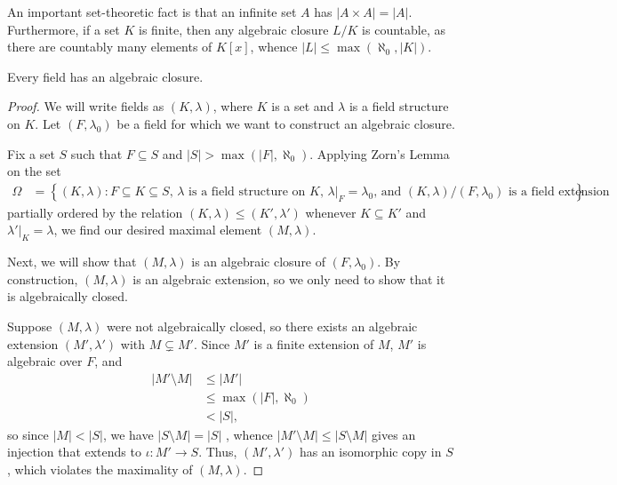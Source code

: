 \documentclass[10pt]{mypackage}
\begin{document}
An important set-theoretic fact is that an infinite set $A$ has $\left\vert A\times A \right\vert = \left\vert A \right\vert$. Furthermore, if a set $K$ is finite, then any algebraic closure $L/K$ is countable, as there are countably many elements of $K[x]$, whence $\left\vert L \right\vert\leq \max\left( \aleph_0,\left\vert K \right\vert \right)$.
\begin{theorem}
  Every field has an algebraic closure.
\end{theorem}
\begin{proof}
  We will write fields as $\left( K,\lambda \right)$, where $K$ is a set and $\lambda$ is a field structure on $K$. Let $\left( F,\lambda_0 \right)$ be a field for which we want to construct an algebraic closure.

  Fix a set $S$ such that $F\subseteq S$ and $\left\vert S \right\vert > \max\left( \left\vert F \right\vert,\aleph_0 \right)$. Applying Zorn's Lemma on the set
  \begin{align*}
    \Omega &= \left\{\left( K,\lambda \right) : \text{$F\subseteq K\subseteq S$, $\lambda$ is a field structure on $K$, $\lambda|_{F} = \lambda_0$, and $\left( K,\lambda \right)/\left( F,\lambda_0 \right)$ is a field extension}\right\}
  \end{align*}
  partially ordered by the relation $\left( K,\lambda \right)\leq \left( K',\lambda' \right)$ whenever $K\subseteq K'$ and $\lambda'|_{K} = \lambda$, we find our desired maximal element $\left( M,\lambda \right)$.

  Next, we will show that $\left( M,\lambda \right)$ is an algebraic closure of $\left( F,\lambda_0 \right)$. By construction, $\left( M,\lambda \right)$ is an algebraic extension, so we only need to show that it is algebraically closed.

  Suppose $\left( M,\lambda \right)$ were not algebraically closed, so there exists an algebraic extension $\left( M',\lambda' \right)$ with $M\subsetneq M'$. Since $M'$ is a finite extension of $M$, $M'$ is algebraic over $F$, and
  \begin{align*}
    \left\vert M'\setminus M \right\vert &\leq \left\vert M' \right\vert\\
                                         &\leq \max \left( \left\vert F \right\vert,\aleph_0 \right)\\
                                         &< \left\vert S \right\vert,
  \end{align*}
  so since $\left\vert M \right\vert < \left\vert S \right\vert$, we have $\left\vert S\setminus M \right\vert = \left\vert S \right\vert$ , whence $\left\vert M'\setminus M \right\vert\leq \left\vert S\setminus M \right\vert$ gives an injection that extends to $\iota\colon M'\rightarrow S$. Thus, $\left( M',\lambda' \right)$ has an isomorphic copy in $S$, which violates the maximality of $\left( M,\lambda \right)$.
\end{proof}
\end{document}
